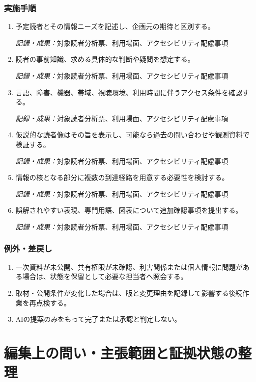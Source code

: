 \documentclass[a4paper,11pt]{article}
\begin{document}
\subsubsection*{実施手順}
\begin{enumerate}[leftmargin=2em,itemsep=0.65em]
\item 予定読者とその情報ニーズを記述し、企画元の期待と区別する。\par\noindent\textit{記録・成果：}対象読者分析票、利用場面、アクセシビリティ配慮事項\nobreak\smallskip
\item 読者の事前知識、求める具体的な判断や疑問を想定する。\par\noindent\textit{記録・成果：}対象読者分析票、利用場面、アクセシビリティ配慮事項\nobreak\smallskip
\item 言語、障害、機器、帯域、視聴環境、利用時間に伴うアクセス条件を確認する。\par\noindent\textit{記録・成果：}対象読者分析票、利用場面、アクセシビリティ配慮事項\nobreak\smallskip
\item 仮説的な読者像はその旨を表示し、可能なら過去の問い合わせや観測資料で検証する。\par\noindent\textit{記録・成果：}対象読者分析票、利用場面、アクセシビリティ配慮事項\nobreak\smallskip
\item 情報の核となる部分に複数の到達経路を用意する必要性を検討する。\par\noindent\textit{記録・成果：}対象読者分析票、利用場面、アクセシビリティ配慮事項\nobreak\smallskip
\item 誤解されやすい表現、専門用語、図表について追加確認事項を提出する。\par\noindent\textit{記録・成果：}対象読者分析票、利用場面、アクセシビリティ配慮事項\nobreak\smallskip
\end{enumerate}
\subsubsection*{例外・差戻し}
\begin{enumerate}[leftmargin=2em,itemsep=0.35em]
\item 一次資料が未公開、共有権限が未確認、利害関係または個人情報に問題がある場合は、状態を保留として必要な担当者へ照会する。
\item 取材・公開条件が変化した場合は、版と変更理由を記録して影響する後続作業を再点検する。
\item AIの提案のみをもって完了または承認と判定しない。
\end{enumerate}
\section{編集上の問い・主張範囲と証拠状態の整理}
\end{document}
